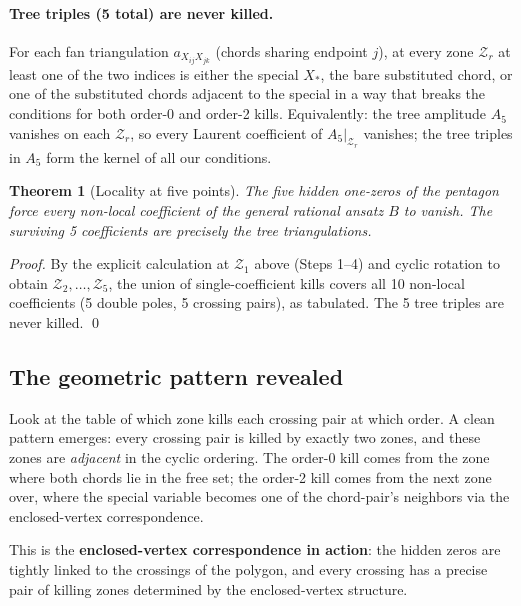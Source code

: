 \documentclass[11pt]{article}
\newcommand{\X}[2]{X_{#1#2}}
\newcommand{\Z}{\mathcal{Z}}
\newtheorem{theorem}{Theorem}
\theoremstyle{definition}
\begin{document}
\paragraph{Tree triples (5 total) are never killed.} For each fan triangulation
$a_{\X{i}{j}\X{j}{k}}$ (chords sharing endpoint $j$), at every zone $\Z_r$
at least one of the two indices is either the special $X_*$, the bare
substituted chord, or one of the substituted chords adjacent to the special
in a way that breaks the conditions for both order-0 and order-2 kills.
Equivalently: the tree amplitude $A_5$ vanishes on each $\Z_r$, so every
Laurent coefficient of $A_5|_{\Z_r}$ vanishes; the tree triples
in $A_5$ form the kernel of all our conditions.

\begin{theorem}[Locality at five points]
The five hidden one-zeros of the pentagon force every non-local coefficient
of the general rational ansatz $B$ to vanish. The surviving 5 coefficients
are precisely the tree triangulations.
\end{theorem}

\begin{proof}
By the explicit calculation at $\Z_1$ above (Steps 1--4) and cyclic rotation
to obtain $\Z_2,\ldots,\Z_5$, the union of single-coefficient kills covers
all 10 non-local coefficients (5 double poles, 5 crossing pairs), as
tabulated. The 5 tree triples are never killed. \qed
\end{proof}

\subsection{The geometric pattern revealed}
\label{sec:geometric-pattern-n5}

Look at the table of which zone kills each crossing pair at which order.
A clean pattern emerges: every crossing pair is killed by exactly two zones,
and these zones are \emph{adjacent} in the cyclic ordering. The order-0
kill comes from the zone where both chords lie in the free set; the order-2
kill comes from the next zone over, where the special variable becomes one
of the chord-pair's neighbors via the enclosed-vertex correspondence.

This is the \textbf{enclosed-vertex correspondence in action}: the hidden
zeros are tightly linked to the crossings of the polygon, and every
crossing has a precise pair of killing zones determined by the
enclosed-vertex structure.

\end{document}

